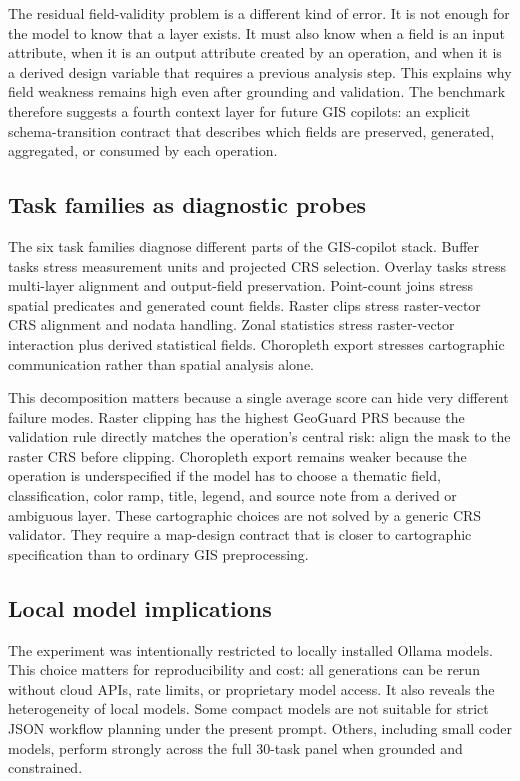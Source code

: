 \documentclass[]{interact}
\begin{document}
The residual field-validity problem is a different kind of error. It is not enough for the model to know that a layer exists. It must also know when a field is an input attribute, when it is an output attribute created by an operation, and when it is a derived design variable that requires a previous analysis step. This explains why field weakness remains high even after grounding and validation. The benchmark therefore suggests a fourth context layer for future GIS copilots: an explicit schema-transition contract that describes which fields are preserved, generated, aggregated, or consumed by each operation.

\subsection{Task families as diagnostic probes}

The six task families diagnose different parts of the GIS-copilot stack. Buffer tasks stress measurement units and projected CRS selection. Overlay tasks stress multi-layer alignment and output-field preservation. Point-count joins stress spatial predicates and generated count fields. Raster clips stress raster-vector CRS alignment and nodata handling. Zonal statistics stress raster-vector interaction plus derived statistical fields. Choropleth export stresses cartographic communication rather than spatial analysis alone.

This decomposition matters because a single average score can hide very different failure modes. Raster clipping has the highest GeoGuard PRS because the validation rule directly matches the operation's central risk: align the mask to the raster CRS before clipping. Choropleth export remains weaker because the operation is underspecified if the model has to choose a thematic field, classification, color ramp, title, legend, and source note from a derived or ambiguous layer. These cartographic choices are not solved by a generic CRS validator. They require a map-design contract that is closer to cartographic specification than to ordinary GIS preprocessing.

\subsection{Local model implications}

The experiment was intentionally restricted to locally installed Ollama models. This choice matters for reproducibility and cost: all generations can be rerun without cloud APIs, rate limits, or proprietary model access. It also reveals the heterogeneity of local models. Some compact models are not suitable for strict JSON workflow planning under the present prompt. Others, including small coder models, perform strongly across the full 30-task panel when grounded and constrained.
\end{document}
